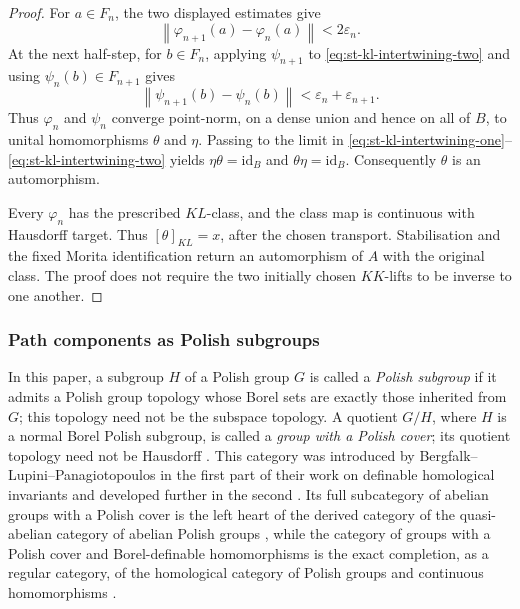 \begin{proof}
For $a\in F_n$, the two displayed estimates give 
\begin{equation*}
\left\|\varphi_{n+1}(a)-\varphi_n(a)\right\|<2\varepsilon_n. 
\end{equation*}
At the next half-step, for $b\in F_n$, applying $\psi_{n+1}$ to \eqref{eq:st-kl-intertwining-two} and using $\psi_n(b)\in F_{n+1}$ gives 
\begin{equation*}
\left\|\psi_{n+1}(b)-\psi_n(b)\right\|  <\varepsilon_n+\varepsilon_{n+1}. 
\end{equation*}
Thus $\varphi_n$ and $\psi_n$ converge point-norm, on a dense union and
hence on all of $B$, to unital homomorphisms $\theta$ and $\eta$. Passing to
the limit in \eqref{eq:st-kl-intertwining-one}--\eqref{eq:st-kl-intertwining-two}
yields $\eta\theta=\mathrm{id}_B$ and $\theta\eta=\mathrm{id}_B$.
Consequently $\theta$ is an automorphism.

Every $\varphi_n$ has the prescribed $KL$-class, and the class map is
continuous with Hausdorff target. Thus $[\theta]_{KL}=x$, after the chosen
transport. Stabilisation and the fixed Morita identification return an
automorphism of $A$ with the original class. The proof does not require the
two initially chosen $KK$-lifts to be inverse to one another.
\end{proof}


\subsubsection{Path components as Polish subgroups}

In this paper, a subgroup $H$ of a Polish group $G$ is called a \emph{Polish
subgroup} if it admits a Polish group topology whose Borel sets are exactly
those inherited from $G$; this topology need not be the subspace topology. A
quotient $G/H$, where $H$ is a normal Borel Polish subgroup, is called a 
\emph{group with a Polish cover}; its quotient topology need not be
Hausdorff \cite[Remark 1.17]{LupiniDefinableKHomology2020}. This category was introduced by
Bergfalk--Lupini--Panagiotopoulos in the first part of their work on
definable homological invariants \cite{BergfalkLupiniPanagiotopoulos2024a} and developed further in the
second \cite{BergfalkLupiniPanagiotopoulos2024b}. Its full subcategory of abelian groups with a Polish
cover is the left heart of the derived category of the quasi-abelian
category of abelian Polish groups \cite{Lupini2024Heart}, while the category of
groups with a Polish cover and Borel-definable homomorphisms is the exact
completion, as a regular category, of the homological category of Polish
groups and continuous homomorphisms \cite{LupiniExactCompletion2026}.

